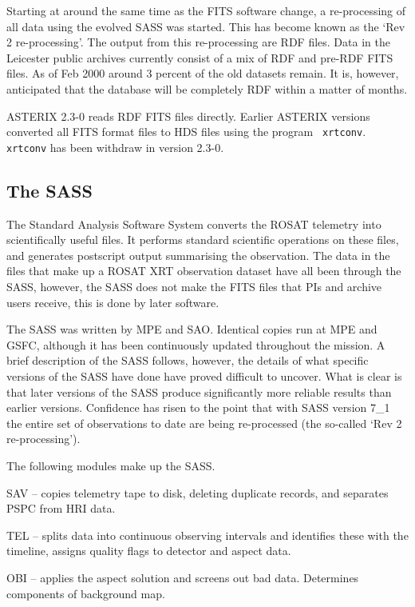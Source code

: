 \documentclass[11pt,fleqn]{article}    %
\begin{document}
Starting at    around the  same  time  as   the FITS    software change,  a
re-processing  of all data using  the evolved SASS   was started.  This has
become   known as the    `Rev   2 re-processing'.  The   output   from  this
re-processing are   RDF files.   Data in   the Leicester   public  archives
currently consist of  a mix of RDF  and pre-RDF FITS files.  As of Feb 2000
around 3 percent of  the old datasets   remain. It is, however,  anticipated
that the database will be completely RDF within a matter of months.

ASTERIX  2.3-0  reads RDF FITS  files directly.   Earlier  ASTERIX versions
converted  all FITS format   files  to HDS files    using the program  {\tt
  xrtconv}.  {\tt xrtconv} has been withdraw in version 2.3-0.

\subsection{The SASS}
The Standard Analysis Software System converts the ROSAT telemetry into
scientifically useful files. It performs standard scientific operations on
these files, and generates postscript output summarising the observation.
The data in the files that make up a ROSAT XRT observation dataset have all
been through the SASS, however, the SASS does not make the FITS files that PIs
and archive users receive, this is done by later software.

The SASS was written by MPE and SAO. Identical copies run at MPE and
GSFC, although it has been continuously updated throughout the mission.  
A brief description of the SASS follows, however, the details of what
specific versions of the SASS have done have proved difficult to uncover.
What is clear is that later versions of the SASS produce significantly more
reliable results than earlier versions. Confidence has risen to the point
that with SASS version 7\_1 the entire set of observations to date are being
re-processed (the so-called `Rev 2 re-processing').

The following modules make up the SASS.

SAV -- copies telemetry tape to disk, deleting duplicate records, and
separates PSPC from HRI data.

TEL -- splits data into continuous observing intervals and identifies
these with the timeline, assigns quality flags to detector and aspect data.

OBI -- applies the aspect solution and screens out bad data. Determines
components of background map.
\end{document}
